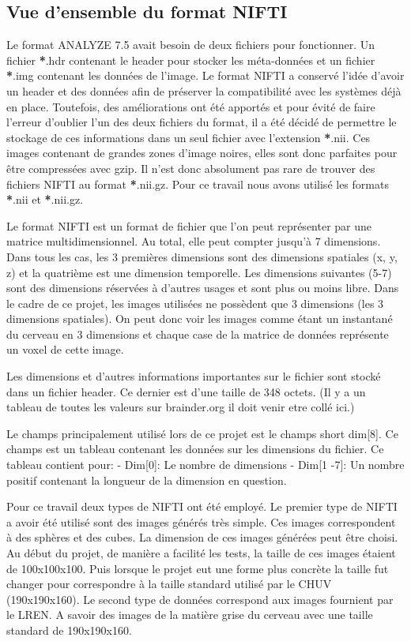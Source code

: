 \documentclass[a4paper,10pt,openany,oneside]{sphinxmanual}
\begin{document}
\subsection{Vue d'ensemble du format NIFTI}
\label{index:vue-d-ensemble-du-format-nifti}
Le format ANALYZE 7.5 avait besoin de deux fichiers pour fonctionner. Un fichier {\color{red}\bfseries{}*}.hdr contenant
le header pour stocker les méta-données et un fichier {\color{red}\bfseries{}*}.img contenant les données de l'image.
Le format NIFTI a conservé l'idée d'avoir un header et des données afin de préserver la compatibilité
avec les systèmes déjà en place. Toutefois, des améliorations ont été apportés et pour évité de faire
l'erreur d'oublier l'un des deux fichiers du format, il a été décidé de permettre le stockage de ces
informations dans un seul fichier avec l'extension {\color{red}\bfseries{}*}.nii. Ces images contenant de grandes zones d'image
noires, elles sont donc parfaites pour être compressées avec gzip. Il n'est donc absolument
pas rare de trouver des fichiers NIFTI au format {\color{red}\bfseries{}*}.nii.gz. Pour ce travail nous avons utilisé
les formats {\color{red}\bfseries{}*}.nii et {\color{red}\bfseries{}*}.nii.gz.

Le format NIFTI est un format de fichier que l'on peut représenter par une matrice multidimensionnel.
Au total, elle peut compter jusqu'à 7 dimensions. Dans tous les cas, les 3 premières dimensions sont des
dimensions spatiales (x, y, z) et la quatrième est une dimension temporelle. Les dimensions suivantes
(5-7) sont des dimensions réservées à d'autres usages et sont plus ou moins libre. Dans le cadre de ce
projet, les images utilisées ne possèdent que 3 dimensions (les 3 dimensions spatiales). On peut donc voir
les images comme étant un instantané du cerveau en 3 dimensions et chaque case de la matrice de données
représente un voxel de cette image.

Les dimensions et d'autres informations importantes sur le fichier sont stocké dans un fichier
header. Ce dernier est d'une taille de 348 octets. (Il y a un tableau de toutes les valeurs sur
brainder.org il doit venir etre collé ici.)

Le champs principalement utilisé lors de ce projet est le champs short dim{[}8{]}. Ce champs est un
tableau contenant les données sur les dimensions du fichier. Ce tableau contient pour:
- Dim{[}0{]}: Le nombre de dimensions
- Dim{[}1 -7{]}: Un nombre positif contenant la longueur de la dimension en question.

Pour ce travail deux types de NIFTI ont été employé. Le premier type de NIFTI a avoir été utilisé sont des
images générés très simple. Ces images correspondent à des sphères et des cubes. La dimension de ces images
générées peut être choisi. Au début du projet, de manière a facilité les tests, la taille de ces images étaient
de 100x100x100. Puis lorsque le projet eut une forme plus concrète la taille fut changer pour correspondre à la
taille standard utilisé par le CHUV (190x190x160). Le second type de données correspond aux images fournient par
le LREN. A savoir des images de la matière grise du cerveau avec une taille standard de 190x190x160.
\end{document}
